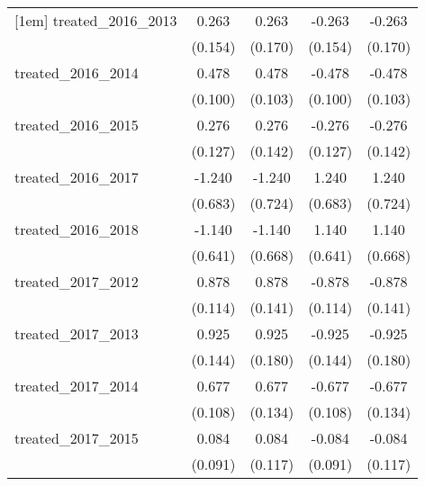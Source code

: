 {\begin{tabular}{l*{4}{c}}
[1em]
treated\_2016\_2013&       0.263         &       0.263         &      -0.263         &      -0.263         \\
            &     (0.154)         &     (0.170)         &     (0.154)         &     (0.170)         \\
[1em]
treated\_2016\_2014&       0.478\sym{***}&       0.478\sym{***}&      -0.478\sym{***}&      -0.478\sym{***}\\
            &     (0.100)         &     (0.103)         &     (0.100)         &     (0.103)         \\
[1em]
treated\_2016\_2015&       0.276\sym{*}  &       0.276         &      -0.276\sym{*}  &      -0.276         \\
            &     (0.127)         &     (0.142)         &     (0.127)         &     (0.142)         \\
[1em]
treated\_2016\_2017&      -1.240         &      -1.240         &       1.240         &       1.240         \\
            &     (0.683)         &     (0.724)         &     (0.683)         &     (0.724)         \\
[1em]
treated\_2016\_2018&      -1.140         &      -1.140         &       1.140         &       1.140         \\
            &     (0.641)         &     (0.668)         &     (0.641)         &     (0.668)         \\
[1em]
treated\_2017\_2012&       0.878\sym{***}&       0.878\sym{***}&      -0.878\sym{***}&      -0.878\sym{***}\\
            &     (0.114)         &     (0.141)         &     (0.114)         &     (0.141)         \\
[1em]
treated\_2017\_2013&       0.925\sym{***}&       0.925\sym{***}&      -0.925\sym{***}&      -0.925\sym{***}\\
            &     (0.144)         &     (0.180)         &     (0.144)         &     (0.180)         \\
[1em]
treated\_2017\_2014&       0.677\sym{***}&       0.677\sym{***}&      -0.677\sym{***}&      -0.677\sym{***}\\
            &     (0.108)         &     (0.134)         &     (0.108)         &     (0.134)         \\
[1em]
treated\_2017\_2015&       0.084         &       0.084         &      -0.084         &      -0.084         \\
            &     (0.091)         &     (0.117)         &     (0.091)         &     (0.117)         \\

\end{tabular}}
